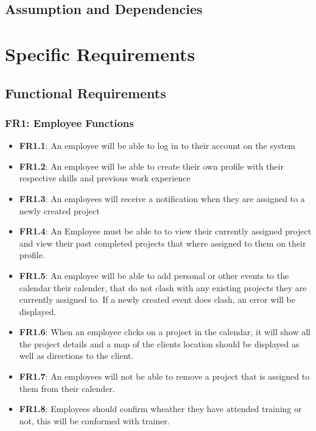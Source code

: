\documentclass[a4paper,12pt]{article}
\begin{document}
\subsection{Assumption and Dependencies}


\section{Specific Requirements}
	\subsection{Functional Requirements}
		\subsubsection{FR1: Employee Functions}
			\begin{itemize}
				\item \textbf{FR1.1}: An employee will be able to log in to their account on the system
				\item \textbf{FR1.2}: An employee will be able to create their own profile with their        respective skills and previous work experience
				\item \textbf{FR1.3}: An employees will receive a notification when they are assigned to a    newly created project 
				
				\item \textbf{FR1.4}: An Employee must be able to to view their currently assigned           project and view their past completed projects that where assigned        to them on their profile. 
				
				\item \textbf{FR1.5}: An employee will be able to add personal or other events to the        calendar their calender, that do not clash with any existing               projects they are currently assigned to. If a newly created event        does clash, an error will be displayed.  
				
				\item \textbf{FR1.6}: When an employee clicks on a project in the calendar, it will show     all the project details and a map of the clients location should be       displayed as well as directions to the client.
				
				\item \textbf{FR1.7}: An employees will not be able to remove a project that is assigned     to them from their calender.
				
				\item \textbf{FR1.8}: Employees should confirm wheather they have attended training or not, this will be conformed with trainer.
			\end{itemize}
	
\end{document}
